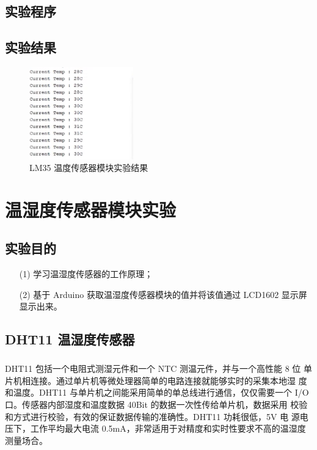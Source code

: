 \documentclass[UTF8, oneside]{ctexbook}
\begin{document}
\section{实验程序}


\section{实验结果}
\begin{figure}[h]
    \centering
    \includegraphics[width=0.4\textwidth]{./result/sensor/10/result.png}
    \caption{LM35 温度传感器模块实验结果}
    \label{10_sensor}
\end{figure}




\chapter{温湿度传感器模块实验}
\section{实验目的}
\begin{itemize}
    \item[(1)] 学习温湿度传感器的工作原理；
    \item[(2)] 基于 Arduino 获取温湿度传感器模块的值并将该值通过 LCD1602 显示屏显示出来。
\end{itemize}


\section{DHT11 温湿度传感器}

\paragraph{}
DHT11 包括一个电阻式测湿元件和一个 NTC 测温元件，并与一个高性能 8 位
单片机相连接。通过单片机等微处理器简单的电路连接就能够实时的采集本地湿
度和温度。DHT11 与单片机之间能采用简单的单总线进行通信，仅仅需要一个 
I/O 口。传感器内部湿度和温度数据 40Bit 的数据一次性传给单片机，数据采用
校验和方式进行校验，有效的保证数据传输的准确性。DHT11 功耗很低，5V 电
源电压下，工作平均最大电流 0.5mA，非常适用于对精度和实时性要求不高的温湿度测量场合。
\end{document}
